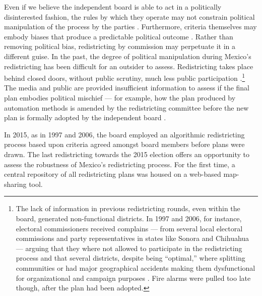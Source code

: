 \documentclass[letter,12pt]{article}
\begin{document}
Even if we believe the independent board is able to act in a politically disinterested fashion, the rules by which they operate may not constrain political manipulation of the process by the parties \citep{lijphart.1990,rossiter.etal.1997,estevez.magar.rosas.2008}. Furthermore, criteria themselves may embody biases that produce a predictable political outcome \citep{parker.1990}. Rather than removing political bias, redistricting by commission may perpetuate it in a different guise. In the past, the degree of political manipulation during Mexico's redistricting has been difficult for an outsider to assess. Redistricting takes place behind closed doors, without public scrutiny, much less public participation \citep{trelles.mtz.tesisItam.2007,trelles.datosabiertos.2015}.\footnote{The lack of information in previous redistricting rounds, even within the board, generated non-functional districts. In 1997 and 2006, for instance, electoral commissioners received complains --- from several local electoral commissions and party representatives in states like Sonora and Chihuahua --- arguing that they where not allowed to participate in the redistricting process and that several districts, despite being ``optimal,'' where splitting communities or had major geographical accidents making them dysfunctional for organizational and campaign purposes \citep{trelles.mtz.tesisItam.2007}. Fire alarms were pulled too late though, after the plan had been adopted.} The media and public are provided insufficient information to assess if the final plan embodies political mischief --- for example, how the plan produced by automation methods is amended by the redistricting committee before the new plan is formally adopted by the independent board \citep{trelles.datosabiertos.2015}.

In 2015, as in 1997 and 2006, the board employed an algorithmic redistricting process based upon criteria agreed amongst board members before plans were drawn. The last redistricting towards the 2015 election offers an opportunity to assess the robustness of Mexico's redistricting process. For the first time, a central repository of all redistricting plans was housed on a web-based map-sharing tool. 
\end{document}
